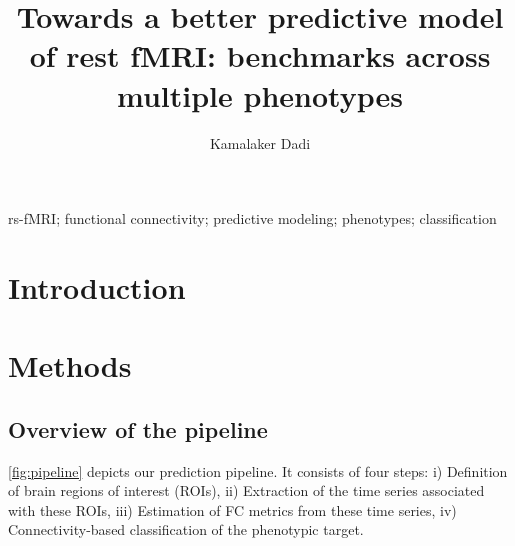 \documentclass[5p]{elsarticle}
\begin{document}

\title{Towards a better predictive model of rest fMRI: benchmarks across
multiple phenotypes}


\author[parietal,cea]{Kamalaker Dadi}


\address[parietal]{Parietal project-team, INRIA Saclay-\^ile de France,
France}
\address[cea]{CEA/Neurospin b\^at 145, 91191 Gif-Sur-Yvette, France}


\begin{abstract}
%
%
\end{abstract}

\begin{keyword}
    rs-fMRI; functional connectivity; predictive modeling; phenotypes;
    classification
\end{keyword}

\maketitle%

\vspace*{-3em}%

\sloppy %


\section{Introduction}%




\section{Methods}

\subsection{Overview of the pipeline}
\autoref{fig:pipeline}  depicts  our  prediction  pipeline.  It  consists  of  four
steps: i) Definition  of  brain  regions  of  interest  (ROIs),
ii) Extraction  of  the  time  series  associated  with  these  ROIs,
iii) Estimation  of  FC  metrics  from  these  time  series,
iv) Connectivity-based classification of the phenotypic target.
\end{document}
